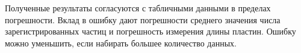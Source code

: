 \documentclass[a4paper, 12pt]{article}%
\begin{document}
	Полученные результаты согласуются с табличными данными в пределах погрешности. Вклад в ошибку дают погрешности среднего значения числа зарегистрированных частиц и погрешность измерения длины пластин. Ошибку можно уменьшить, если набирать большее количество данных. 
	
	
	
	
	
	
	
	
	
	
	
	
	
	
	
	
	
	
\end{document}
